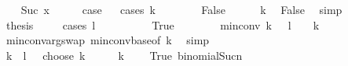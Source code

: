 \begin{isabellebody}
\ \ \isamarkupfalse%
\ {\isacharparenleft}{\kern0pt}Suc\ x{\isacharparenright}{\kern0pt}\isanewline
\ \ \isamarkupfalse%
\ \isamarkupfalse%
\ {\isacharquery}{\kern0pt}case\isanewline
\ \ \isamarkupfalse%
{\isacharparenleft}{\kern0pt}cases\ {\isachardoublequoteopen}k\ {\isacharequal}{\kern0pt}\ {}{\isachardoublequoteclose}{\isacharparenright}{\kern0pt}\isanewline
\ \ \ \ \isamarkupfalse%
\ False\isanewline
\ \ \ \ \isamarkupfalse%
\ {}{\isacharcolon}{\kern0pt}{\isachardoublequoteopen}k{\isasymge}{}{\isachardoublequoteclose}\ \isamarkupfalse%
\ False\ \isamarkupfalse%
\ simp\isanewline
\ \ \ \ \isamarkupfalse%
\ {\isacharquery}{\kern0pt}thesis\isanewline
\ \ \ \ \isamarkupfalse%
{\isacharparenleft}{\kern0pt}cases\ {\isachardoublequoteopen}l\ {\isacharequal}{\kern0pt}\ {}{\isachardoublequoteclose}{\isacharparenright}{\kern0pt}\isanewline
\ \ \ \ \ \ \isamarkupfalse%
\ True\isanewline
\ \ \ \ \ \ \isamarkupfalse%
\ {\isachardoublequoteopen}min{\isacharunderscore}{\kern0pt}conv\ {\isacharparenleft}{\kern0pt}k\ {\isacharplus}{\kern0pt}\ {}{\isacharparenright}{\kern0pt}\ {\isacharparenleft}{\kern0pt}l\ {\isacharplus}{\kern0pt}\ {}{\isacharparenright}{\kern0pt}\ {\isacharequal}{\kern0pt}\ k\ {\isacharplus}{\kern0pt}\ {}{\isachardoublequoteclose}\ \isanewline
\ \ \ \ \ \ \ \ \isamarkupfalse%
\ min{\isacharunderscore}{\kern0pt}conv{\isacharunderscore}{\kern0pt}arg{\isacharunderscore}{\kern0pt}swap\ min{\isacharunderscore}{\kern0pt}conv{\isacharunderscore}{\kern0pt}base{\isacharbrackleft}{\kern0pt}of\ {\isachardoublequoteopen}k{\isacharplus}{\kern0pt}{}{\isachardoublequoteclose}{\isacharbrackright}{\kern0pt}\ \isamarkupfalse%
\ simp\isanewline
\ \ \ \ \ \ \isamarkupfalse%
\ \isamarkupfalse%
\ {\isachardoublequoteopen}{\isacharparenleft}{\kern0pt}k\ {\isacharplus}{\kern0pt}\ l\ {\isacharplus}{\kern0pt}\ {}\ choose\ k\ {\isacharplus}{\kern0pt}\ {}{\isacharparenright}{\kern0pt}\ {\isacharplus}{\kern0pt}\ {}\ {\isacharequal}{\kern0pt}\ k\ {\isacharplus}{\kern0pt}\ {}{\isachardoublequoteclose}\ \isamarkupfalse%
\ True\ binomial{\isacharunderscore}{\kern0pt}Suc{\isacharunderscore}{\kern0pt}n\ \isamarkupfalse%

\end{isabellebody}
